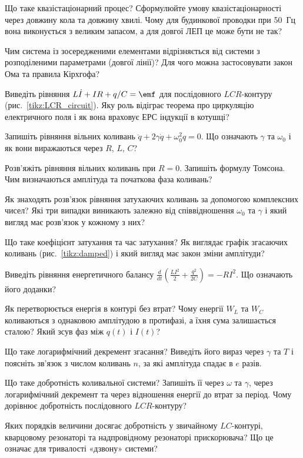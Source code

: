\begin{Questions}
\begin{quizlist}
	\item Що таке квазістаціонарний процес? Сформулюйте умову квазістаціонарності через довжину кола та довжину хвилі. Чому для будинкової проводки при 50~Гц вона виконується з великим запасом, а для довгої ЛЕП це може бути не так?
	\item Чим система із зосередженими елементами відрізняється від системи з розподіленими параметрами (довгої лінії)? Для чого можна застосовувати закон Ома та правила Кірхгофа?
	\item Виведіть рівняння $L\dot I + IR + q/C = \emf$ для послідовного $LCR$-контуру (рис.~\ref{tikz:LCR_circuit}). Яку роль відіграє теорема про циркуляцію електричного поля і як вона враховує ЕРС індукції в котушці?
	\item Запишіть рівняння вільних коливань $\ddot q + 2\gamma\dot q + \omega_0^2 q = 0$. Що означають $\gamma$ та $\omega_0$ і як вони виражаються через $R$, $L$, $C$?
	\item Розв'яжіть рівняння вільних коливань при $R=0$. Запишіть формулу Томсона. Чим визначаються амплітуда та початкова фаза коливань?
	\item Як знаходять розв'язок рівняння затухаючих коливань за допомогою комплексних чисел? Які три випадки виникають залежно від співвідношення $\omega_0$ та $\gamma$ і який вигляд має розв'язок у кожному з них?
	\item Що таке коефіцієнт затухання та час затухання? Як виглядає графік згасаючих коливань (рис.~\ref{tikz:damped}) і який вигляд має закон зміни амплітуди?
	\item Виведіть рівняння енергетичного балансу $\frac{d}{dt}\left(\frac{LI^2}{2}+\frac{q^2}{2C}\right) = -RI^2$. Що означають його доданки?
	\item Як перетворюється енергія в контурі без втрат? Чому енергії $W_L$ та $W_C$ коливаються з однаковою амплітудою в протифазі, а їхня сума залишається сталою? Який зсув фаз між $q(t)$ і $I(t)$?
	\item Що таке логарифмічний декремент згасання? Виведіть його вираз через $\gamma$ та $T$ і поясніть зв'язок з числом коливань $n$, за які амплітуда спадає в $e$ разів.
	\item Що таке добротність коливальної системи? Запишіть її через $\omega$ та $\gamma$, через логарифмічний декремент та через відношення енергії до втрат за період. Чому дорівнює добротність послідовного $LCR$-контуру?
	\item Яких порядків величини досягає добротність у звичайному $LC$-контурі, кварцовому резонаторі та надпровідному резонаторі прискорювача? Що це означає для тривалості «дзвону» системи?

\end{quizlist}
\end{Questions}

